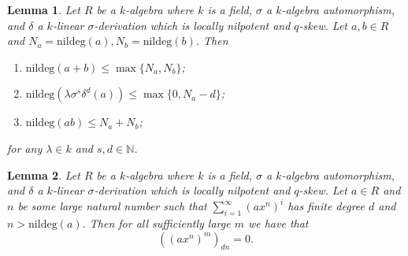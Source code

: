 \documentclass[10pt,a4paper]{amsart}
\newtheorem{lem}{Lemma}
\begin{document}
\begin{lem}
    \label{nildeglem}
    Let $R$ be a $k$-algebra where $k$ is a field, $\sigma$ a $k$-algebra automorphism, and $\delta$ a $k$-linear
    $\sigma$-derivation which is locally nilpotent and $q$-skew. Let $a,b \in R$ and $N_a = \text{nildeg}(a), N_b = \text{nildeg}(b)$. Then \begin{enumerate}
        \item \label{nildeg1}$\text{nildeg}(a+b)\leq \max\{N_a,N_b\}$;
        \item\label{nildeg3}$\text{nildeg}(\lambda\sigma^s\delta^d(a))\leq\max\{0,N_a-d\}$;
        \item\label{nildeg2}$\text{nildeg}(ab)\leq N_a+N_b  $;
    \end{enumerate}
    for any $\lambda\in k$ and $s,d \in \mathbb{N}$.
\end{lem}

\begin{lem}
    \label{mexists}  Let $R$ be a $k$-algebra where $k$ is a field, $\sigma$ a $k$-algebra automorphism, and $\delta$ a $k$-linear
    $\sigma$-derivation which is locally nilpotent and $q$-skew. Let $a \in R$ and $n$ be some large natural number such that $\sum_{i=1}^\infty (ax^n)^i$ has finite degree $d$ and $n > \text{nildeg}(a)$. Then for all sufficiently large $m$ we have that \[
        ((ax^n)^m)_{dn} = 0.
    \]
\end{lem}
\end{document}
